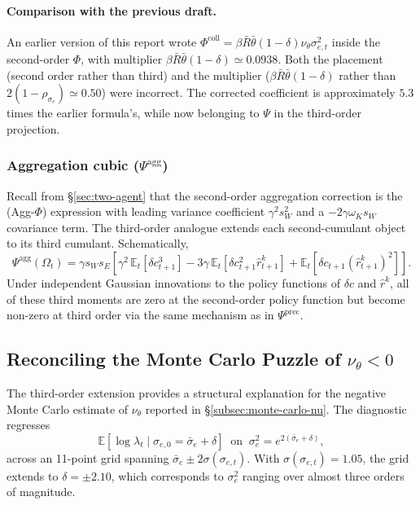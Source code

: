 \documentclass[11pt]{article}
\newcommand{\E}{\mathbb{E}}
\newcommand{\nuth}{\nu_\theta}
\theoremstyle{plain}
\theoremstyle{definition}
\begin{document}
\paragraph{Comparison with the previous draft.}
An earlier version of this report wrote
$\Phi^{\mathrm{coll}}=\beta\bar R\bar\theta(1-\delta)\nuth\sigma_{e,t}^2$
inside the second-order $\Phi$, with multiplier
$\beta\bar R\bar\theta(1-\delta)\simeq 0.0938$. Both the placement
(second order rather than third) and the multiplier
($\beta\bar R\bar\theta(1-\delta)$ rather than $2(1-\rho_{\sigma_e})\simeq 0.50$)
were incorrect. The corrected coefficient is approximately $5.3$ times the
earlier formula's, while now belonging to $\Psi$ in the third-order
projection.

\subsubsection*{Aggregation cubic ($\Psi^{\mathrm{agg}}$)}

Recall from §\ref{sec:two-agent} that the second-order aggregation
correction is the (Agg-$\Phi$) expression with leading variance coefficient
$\gamma^2 s_W^2$ and a $-2\gamma\omega_K s_W$ covariance term. The
third-order analogue extends each second-cumulant object to its third
cumulant. Schematically,
\begin{equation}
\Psi^{\mathrm{agg}}(\Omega_t)
=
\gamma s_Ws_E
\left[
\gamma^2\,\E_t[\delta c_{t+1}^3]
- 3\gamma\,\E_t[\delta c_{t+1}^2\hat r^k_{t+1}]
+ \E_t[\delta c_{t+1}(\hat r^k_{t+1})^2]
\right].
\tag{Psi-Agg}
\end{equation}
Under independent Gaussian innovations to the policy functions of $\delta c$
and $\hat r^k$, all of these third moments are zero at the second-order policy
function but become non-zero at third order via the same mechanism as in
$\Psi^{\mathrm{prec}}$.

\subsection{Reconciling the Monte Carlo Puzzle of \texorpdfstring{$\nuth<0$}{nu theta < 0}}

The third-order extension provides a structural explanation for the negative
Monte Carlo estimate of $\nuth$ reported in §\ref{subsec:monte-carlo-nu}.
The diagnostic regresses
\[
\E[\log\lambda_t\mid\sigma_{e,0}=\bar\sigma_e + \delta]\;\;\text{on}\;\;
\sigma_e^2 = e^{2(\bar\sigma_e+\delta)},
\]
across an 11-point grid spanning $\bar\sigma_e\pm 2\sigma(\sigma_{e,t})$. With
$\sigma(\sigma_{e,t})=1.05$, the grid extends to $\delta=\pm 2.10$, which
corresponds to $\sigma_e^2$ ranging over almost three orders of magnitude.
\end{document}
